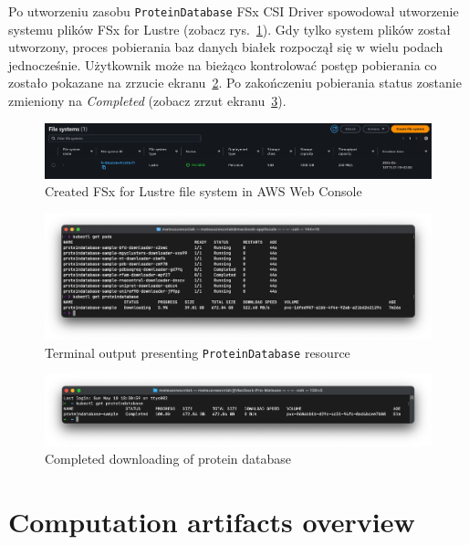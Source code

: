 Po utworzeniu zasobu \texttt{ProteinDatabase} FSx CSI Driver spowodował utworzenie systemu plików FSx for Lustre (zobacz rys.~\ref{fig:fsx_fs}).
Gdy tylko system plików został utworzony, proces pobierania baz danych białek rozpoczął się w wielu podach jednocześnie.
Użytkownik może na bieżąco kontrolować postęp pobierania co zostało pokazane na zrzucie ekranu~\ref{fig:used_proteindatabase_terminal}.
Po zakończeniu pobierania status zostanie zmieniony na \textit{Completed} (zobacz zrzut ekranu~\ref{fig:proteindatabase_completed_terminal}).

\begin{figure}[htbp]
  \centering
  \includegraphics[width=\textwidth]{images/fsx_fs}
  \caption{Created FSx for Lustre file system in AWS Web Console}
  \label{fig:fsx_fs}
\end{figure}

\begin{figure}[htbp]
  \centering
  \includegraphics[width=\textwidth]{images/old_proteindatabase_terminal}
  \caption{Terminal output presenting \texttt{ProteinDatabase} resource}
  \label{fig:used_proteindatabase_terminal}
\end{figure}

\begin{figure}[htbp]
  \centering
  \includegraphics[width=\textwidth]{images/proteindatabase_completed_terminal}
  \caption{Completed downloading of protein database}
  \label{fig:proteindatabase_completed_terminal}
\end{figure}

\section{Computation artifacts overview}
